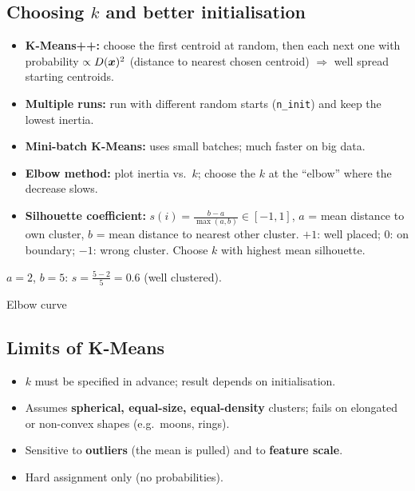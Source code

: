 \subsection{Choosing $k$ and better initialisation}
\begin{itemize}
  \item \textbf{K-Means++:} choose the first centroid at random, then each next one with probability $\propto D(\boldsymbol{x})^2$ (distance to nearest chosen centroid) $\Rightarrow$ well spread starting centroids.
  \item \textbf{Multiple runs:} run with different random starts (\texttt{n\_init}) and keep the lowest inertia.
  \item \textbf{Mini-batch K-Means:} uses small batches; much faster on big data.
  \item \textbf{Elbow method:} plot inertia vs.\ $k$; choose the $k$ at the ``elbow'' where the decrease slows.
  \item \textbf{Silhouette coefficient:} $s(i)=\frac{b-a}{\max(a,b)}\in[-1,1]$, $a$ = mean distance to own cluster, $b$ = mean distance to nearest other cluster. $+1$: well placed; $0$: on boundary; $-1$: wrong cluster. Choose $k$ with highest mean silhouette.
\end{itemize}
\begin{numer}[: silhouette]
$a=2$, $b=5$: $s=\frac{5-2}{5}=\mathbf{0.6}$ (well clustered).
\end{numer}

\begin{drawit}{Elbow curve}
\centering
{}
\end{drawit}

\subsection{Limits of K-Means}
\begin{itemize}
  \item $k$ must be specified in advance; result depends on initialisation.
  \item Assumes \textbf{spherical, equal-size, equal-density} clusters; fails on elongated or non-convex shapes (e.g.\ moons, rings).
  \item Sensitive to \textbf{outliers} (the mean is pulled) and to \textbf{feature scale}.
  \item Hard assignment only (no probabilities).
\end{itemize}


